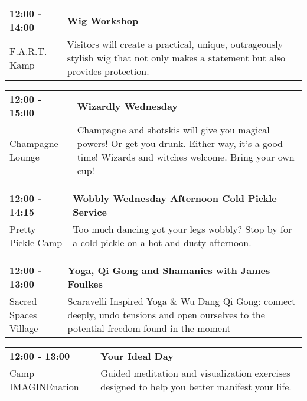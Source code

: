 \begin{tabular}{ p{1in} p{2.2in} }
    \textbf{12:00 - 14:00} & \textbf{Wig Workshop} \\
    F.A.R.T. Kamp \newline  & Visitors will create a practical, unique, outrageously stylish wig that not only makes a statement but also provides protection. \\
    \hline 
\end{tabular}
    
\begin{tabular}{ p{1in} p{2.2in} }
    \textbf{12:00 - 15:00} & \textbf{Wizardly Wednesday } \\
    Champagne Lounge \newline  & Champagne and shotskis will give you magical powers! Or get you drunk. Either way, it's a good time! Wizards and witches welcome. Bring your own cup! \\
    \hline 
\end{tabular}
    
\begin{tabular}{ p{1in} p{2.2in} }
    \textbf{12:00 - 14:15} & \textbf{Wobbly Wednesday Afternoon Cold Pickle Service} \\
    Pretty Pickle Camp \newline  & Too much dancing got your legs wobbly? Stop by for a cold pickle on a hot and dusty afternoon. \\
    \hline 
\end{tabular}
    
\begin{tabular}{ p{1in} p{2.2in} }
    \textbf{12:00 - 13:00} & \textbf{Yoga, Qi Gong and Shamanics with James Foulkes} \\
    Sacred Spaces Village \newline  & Scaravelli Inspired Yoga \& Wu Dang Qi Gong: connect deeply, undo tensions and open ourselves to the potential freedom found in the moment \\
    \hline 
\end{tabular}
    
\begin{tabular}{ p{1in} p{2.2in} }
    \textbf{12:00 - 13:00} & \textbf{Your Ideal Day} \\
    Camp IMAGINEnation \newline  & Guided meditation and visualization exercises designed to help you better manifest your life. \\
    \hline 
\end{tabular}
    
